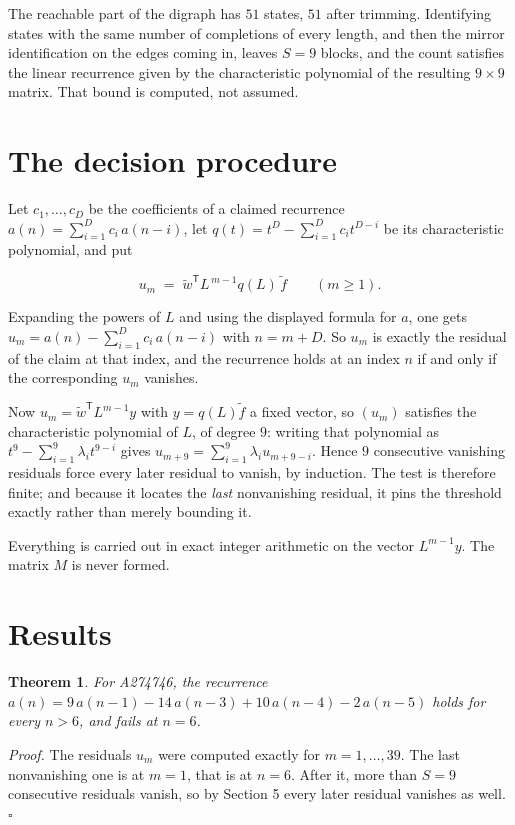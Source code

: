 \documentclass[11pt]{article}
\newtheorem{theorem}{Theorem}
\theoremstyle{definition}
\begin{document}
The reachable part of the digraph has $51$ states, $51$ after trimming. Identifying states with the same number of completions of every length, and then the mirror identification on the edges coming in, leaves $S = 9$ blocks, and the count satisfies the linear recurrence given by the characteristic polynomial of the resulting $9\times9$ matrix. That bound is computed, not assumed.

\section{The decision procedure}

Let $c_1,\dots,c_D$ be the coefficients of a claimed recurrence $a(n) = \sum_{i=1}^{D} c_i\,a(n-i)$, let $q(t) = t^{D} - \sum_{i=1}^{D} c_i t^{D-i}$ be its characteristic polynomial, and put

\[u_m \;=\; \tilde w^{\mathsf T} L^{\,m-1} q(L)\,\tilde f \qquad (m \ge 1).\]

Expanding the powers of $L$ and using the displayed formula for $a$, one gets $u_m = a(n) - \sum_{i=1}^{D} c_i\,a(n-i)$ with $n = m + D$. So $u_m$ is exactly the residual of the claim at that index, and the recurrence holds at an index $n$ if and only if the corresponding $u_m$ vanishes.

Now $u_m = \tilde w^{\mathsf T} L^{m-1} y$ with $y = q(L)\tilde f$ a fixed vector, so $(u_m)$ satisfies the characteristic polynomial of $L$, of degree $9$: writing that polynomial as $t^{9} - \sum_{i=1}^{9} \lambda_i t^{9-i}$ gives $u_{m+9} = \sum_{i=1}^{9} \lambda_i u_{m+9-i}$. Hence $9$ consecutive vanishing residuals force every later residual to vanish, by induction. The test is therefore finite; and because it locates the {\itshape last} nonvanishing residual, it pins the threshold exactly rather than merely bounding it.

Everything is carried out in exact integer arithmetic on the vector $L^{m-1}y$. The matrix $M$ is never formed.

\section{Results}

\begin{theorem} For A274746, the recurrence $a(n) = 9\,a(n-1) - 14\,a(n-3) + 10\,a(n-4) - 2\,a(n-5)$ holds for every $n > 6$, and fails at $n = 6$.\end{theorem}

{\itshape Proof.} The residuals $u_m$ were computed exactly for $m = 1,\dots,39$. The last nonvanishing one is at $m = 1$, that is at $n = 6$. After it, more than $S = 9$ consecutive residuals vanish, so by Section 5 every later residual vanishes as well. $\square$
\end{document}
